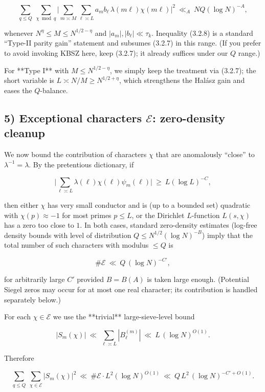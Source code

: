 \documentclass[11pt]{article}
\theoremstyle{definition}
\theoremstyle{remark}
\begin{document}
\begin{equation}
\sum_{q\le Q}\ \sum_{\chi\bmod q}
\Big|\sum_{m\asymp M}\sum_{\ell\asymp L} a_m b_\ell\,\lambda(m\ell)\chi(m\ell)\Big|^2
\ \ll_A\ NQ(\log N)^{-A},
\tag{3.2.8}
\end{equation}

whenever $N^\eta\le M\le N^{1/2-\eta}$ and $|a_m|,|b_\ell|\ll \tau_k$. Inequality (3.2.8) is a standard “Type-II parity gain” statement and subsumes (3.2.7) in this range. (If you prefer to avoid invoking KBSZ here, keep (3.2.7); it already suffices under our $Q$ range.)

For **Type I** with $M\le N^{1/2-\eta}$, we simply keep the treatment via (3.2.7); the short variable is $L\asymp N/M\ge N^{1/2+\eta}$, which strengthens the Halász gain and eases the $Q$-balance.

\subsection*{5) Exceptional characters $\mathcal E$: zero-density cleanup}

We now bound the contribution of characters $\chi$ that are anomalously “close” to $\lambda^{-1}= \lambda$. By the pretentious dictionary, if

$$
\bigg|\sum_{\ell\asymp L} \lambda(\ell)\chi(\ell)\psi_m(\ell)\bigg|\ \ge\ L(\log L)^{-C},
$$

then either $\chi$ has very small conductor and is (up to a bounded set) quadratic with $\chi(p)\approx -1$ for most primes $p\le L$, or the Dirichlet $L$-function $L(s,\chi)$ has a zero too close to $1$. In both cases, standard zero-density estimates (log-free density bounds with level of distribution $Q\le N^{1/2}(\log N)^{-B}$) imply that the total number of such characters with modulus $\le Q$ is

$$
\#\mathcal E\ \ll\ Q\,(\log N)^{-C'},
$$

for arbitrarily large $C'$ provided $B=B(A)$ is taken large enough. (Potential Siegel zeros may occur for at most one real character; its contribution is handled separately below.)

For each $\chi\in\mathcal E$ we use the **trivial** large-sieve-level bound

$$
|S_m(\chi)|\ \ll\ \sum_{\ell\asymp L} |B_\ell^{(m)}|\ \ll\ L\,(\log N)^{O(1)}.
$$

Therefore

$$
\sum_{q\le Q}\ \sum_{\chi\in\mathcal E} |S_m(\chi)|^2
\ \ll\ \#\mathcal E\cdot L^2(\log N)^{O(1)}
\ \ll\ Q\,L^2\,(\log N)^{-C'+O(1)}.
$$
\end{document}
